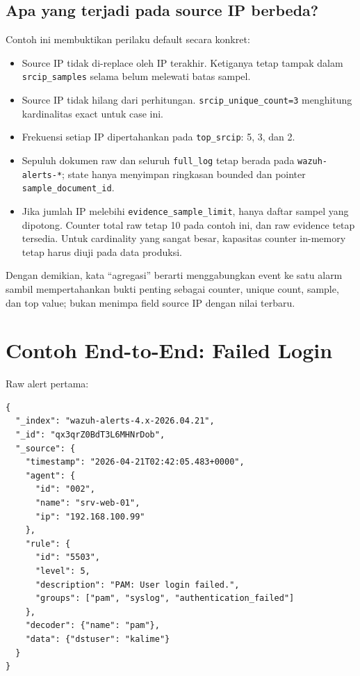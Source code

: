 \documentclass[11pt,a4paper,oneside]{report}
\DeclareRobustCommand{\code}[1]{\nolinkurl{#1}}
\begin{document}
\section{Apa yang terjadi pada source IP berbeda?}

Contoh ini membuktikan perilaku default secara konkret:

\begin{itemize}
  \item Source IP tidak di-replace oleh IP terakhir. Ketiganya tetap tampak dalam
        \code{srcip_samples} selama belum melewati batas sampel.
  \item Source IP tidak hilang dari perhitungan. \code{srcip_unique_count=3}
        menghitung kardinalitas exact untuk case ini.
  \item Frekuensi setiap IP dipertahankan pada \code{top_srcip}: 5, 3, dan 2.
  \item Sepuluh dokumen raw dan seluruh \code{full_log} tetap berada pada
        \code{wazuh-alerts-*}; state hanya menyimpan ringkasan bounded dan pointer
        \code{sample_document_id}.
  \item Jika jumlah IP melebihi \code{evidence_sample_limit}, hanya daftar sampel
        yang dipotong. Counter total raw tetap 10 pada contoh ini, dan raw evidence
        tetap tersedia. Untuk cardinality yang sangat besar, kapasitas counter
        in-memory tetap harus diuji pada data produksi.
\end{itemize}

Dengan demikian, kata ``agregasi'' berarti menggabungkan event ke satu alarm sambil
mempertahankan bukti penting sebagai counter, unique count, sample, dan top value;
bukan menimpa field source IP dengan nilai terbaru.

\chapter{Contoh End-to-End: Failed Login}

Raw alert pertama:

\begin{lstlisting}
{
  "_index": "wazuh-alerts-4.x-2026.04.21",
  "_id": "qx3qrZ0BdT3L6MHNrDob",
  "_source": {
    "timestamp": "2026-04-21T02:42:05.483+0000",
    "agent": {
      "id": "002",
      "name": "srv-web-01",
      "ip": "192.168.100.99"
    },
    "rule": {
      "id": "5503",
      "level": 5,
      "description": "PAM: User login failed.",
      "groups": ["pam", "syslog", "authentication_failed"]
    },
    "decoder": {"name": "pam"},
    "data": {"dstuser": "kalime"}
  }
}
\end{lstlisting}
\end{document}
